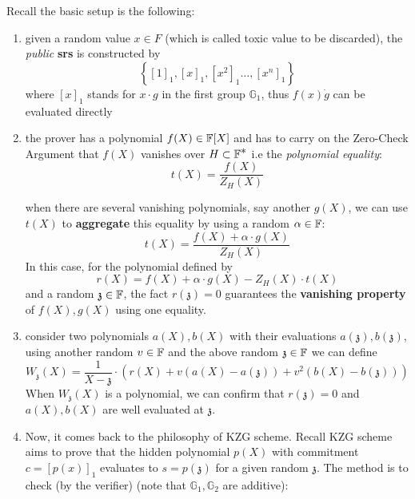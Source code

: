 \documentclass{article}
\begin{document}
Recall the basic setup is the following: 
\begin{enumerate}
\item\label{item:110} given a random value $x \in F$ (which is called toxic value to be discarded), the \textit{public} \textbf{srs} is constructed by 
\begin{equation*}
\left\{ [1]_1, [x]_1, [x^2]_1 \dots, [x^n]_1 \right\}
\end{equation*}
where $[x]_1$ stands for $x \cdot g$ in the first group $\mathbb{G}_1$, thus $f(x) \dot g$ can be evaluated directly
\item\label{item:111} the prover has a polynomial $f(X) \in \mathbb{F} [X]$ and has to carry on the Zero-Check Argument that $f(X)$ vanishes over $H \subset \mathbb{F}^{\displaystyle *}$ i.e the \textit{polynomial equality}:
\begin{equation} \label{eq:t-x}
t(X) = \frac{f(X)}{Z_H(X)} 
\end{equation} 
\begin{remark}
when there are several vanishing polynomials, say another $g(X)$, we can use $t(X)$ to \textbf{aggregate} this equality by using a random $\alpha \in \mathbb{F}$:
\begin{equation*}
t(X) = \frac{f(X) + \alpha \cdot g(X)}{Z_H(X)}
\end{equation*}
In this case, for the polynomial defined by
\begin{equation} \label{eq:r-x}
r(X) = f(X) + \alpha \cdot g(X) - Z_H(X) \cdot t(X)
\end{equation}
and a random $\mathfrak{z} \in \mathbb{F}$, the fact $r(\mathfrak{z}) = 0$ guarantees the \textbf{vanishing property} of $f(X), g(X)$ using one equality. 
\end{remark}
\item\label{item:113} consider two polynomials $a(X), b(X)$ with their evaluations $a(\mathfrak{z}), b(\mathfrak{z})$, using another random $v \in \mathbb{F}$ and the above random $\mathfrak{z} \in \mathbb{F}$ we can define 
\begin{equation*}
W_{\mathfrak{z}}(X) = \frac{1}{X - \mathfrak{z}} \cdot \left( r(X) + v(a(X) - a(\mathfrak{z})) + v^2(b(X) - b(\mathfrak{z})) \right)
\end{equation*}
When $W_{\mathfrak{z}}(X)$ is a polynomial, we can confirm that $r(\mathfrak{z}) = 0$ and $a(X), b(X)$ are well evaluated at $\mathfrak{z}$. 
\item\label{item:114} Now, it comes back to the philosophy of KZG scheme. Recall KZG scheme aims to prove that the hidden polynomial $p(X)$ with commitment $c = [p(x)]_1$ evaluates to $s = p(\mathfrak{z})$ for a given random $\mathfrak{z}$. The method is to check (by the verifier) (note that $\mathbb{G}_1, \mathbb{G}_2$ are additive):

\end{enumerate}
\end{document}
